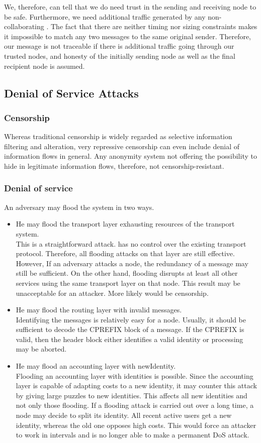 We, therefore, can tell that we do need trust in the sending and receiving node to be safe. Furthermore, we need additional traffic generated by any non-collaborating \VortexNode{}. The fact that there are neither timing nor sizing constraints makes it impossible to match any two messages to the same original sender. Therefore, our message is not traceable if there is additional traffic going through our trusted nodes, and honesty of the initially sending node as well as the final recipient node is assumed.

\subsection{Denial of Service Attacks}
\subsubsection{Censorship}
Whereas traditional censorship is widely regarded as selective information filtering and alteration, very repressive censorship can even include denial of information flows in general. Any anonymity system not offering the possibility to hide in legitimate information flows, therefore, not censorship-resistant.

\subsubsection{Denial of service}
An adversary may flood the system in two ways.
\begin{itemize}
	\item He may flood the transport layer exhausting resources of the transport system.\\
	This is a straightforward attack. \MessageVortex{} has no control over the existing transport protocol. Therefore, all flooding attacks on that layer are still effective. However, If an adversary attacks a node, the redundancy of a message may still be sufficient. On the other hand, flooding disrupts at least all other services using the same transport layer on that node. This result may be unacceptable for an attacker. More likely would be censorship.
	\item He may flood the routing layer with invalid messages.\\ 
	Identifying the messages is relatively easy for a node. Usually, it should be sufficient to decode the CPREFIX block of a message. If the CPREFIX is valid, then the header block either identifies a valid identity or processing may be aborted. 
	\item He may flood an accounting layer with newIdentity.\\
	Flooding an accounting layer with identities is possible. Since the accounting layer is capable of adapting costs to a new identity, it may counter this attack by giving large puzzles to new identities. This affects all new identities and not only those flooding. If a flooding attack is carried out over a long time, a node may decide to split its identity. All recent active users get a new identity, whereas the old one opposes high costs. This would force an attacker to work in intervals and is no longer able to make a permanent DoS attack.
\end{itemize}

